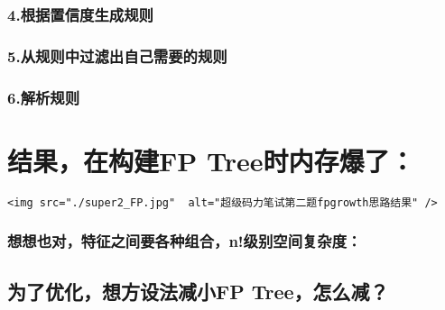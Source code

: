 \documentclass[11pt]{article}
\begin{document}
\hypertarget{ux6839ux636eux7f6eux4fe1ux5ea6ux751fux6210ux89c4ux5219}{%
\subsubsection{4.根据置信度生成规则}\label{ux6839ux636eux7f6eux4fe1ux5ea6ux751fux6210ux89c4ux5219}}

\hypertarget{ux4eceux89c4ux5219ux4e2dux8fc7ux6ee4ux51faux81eaux5df1ux9700ux8981ux7684ux89c4ux5219}{%
\subsubsection{5.从规则中过滤出自己需要的规则}\label{ux4eceux89c4ux5219ux4e2dux8fc7ux6ee4ux51faux81eaux5df1ux9700ux8981ux7684ux89c4ux5219}}

\hypertarget{ux89e3ux6790ux89c4ux5219}{%
\subsubsection{6.解析规则}\label{ux89e3ux6790ux89c4ux5219}}

    \hypertarget{ux7ed3ux679cux5728ux6784ux5efafp-treeux65f6ux5185ux5b58ux7206ux4e86}{%
\section{结果，在构建FP
Tree时内存爆了：}\label{ux7ed3ux679cux5728ux6784ux5efafp-treeux65f6ux5185ux5b58ux7206ux4e86}}

\begin{verbatim}
<img src="./super2_FP.jpg"  alt="超级码力笔试第二题fpgrowth思路结果" />
\end{verbatim}

\hypertarget{ux60f3ux60f3ux4e5fux5bf9ux7279ux5f81ux4e4bux95f4ux8981ux5404ux79cdux7ec4ux5408nux7ea7ux522bux7a7aux95f4ux590dux6742ux5ea6}{%
\subsubsection{想想也对，特征之间要各种组合，n!级别空间复杂度：}\label{ux60f3ux60f3ux4e5fux5bf9ux7279ux5f81ux4e4bux95f4ux8981ux5404ux79cdux7ec4ux5408nux7ea7ux522bux7a7aux95f4ux590dux6742ux5ea6}}

    \hypertarget{ux4e3aux4e86ux4f18ux5316ux60f3ux65b9ux8bbeux6cd5ux51cfux5c0ffp-treeux600eux4e48ux51cf}{%
\subsection{为了优化，想方设法减小FP
Tree，怎么减？}\label{ux4e3aux4e86ux4f18ux5316ux60f3ux65b9ux8bbeux6cd5ux51cfux5c0ffp-treeux600eux4e48ux51cf}}
\end{document}
